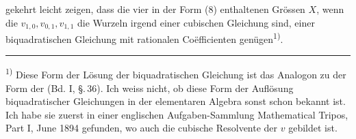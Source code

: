 gekehrt leicht zeigen, dass die vier in der Form (8) enthaltenen
Grössen $X$, wenn die $v_{1,0}, v_{0,1}, v_{1,1}$ die Wurzeln irgend einer
cubischen Gleichung sind, einer biquadratischen Gleichung mit
rationalen Co\"efficienten genügen\textsuperscript{1)}.

\noindent\rule{0.35\linewidth}{0.4pt}

\footnotesize
\noindent\textsuperscript{1)} Diese Form der Lösung der biquadratischen Gleichung ist das
Analogon zu der  Form der  (Bd. I,
\S.\,36). Ich weiss nicht, ob diese Form der Auflösung biquadratischer
Gleichungen in der elementaren Algebra sonst schon bekannt ist. Ich
habe sie zuerst in einer englischen Aufgaben-Sammlung \glqq Mathematical
Tripos, Part I, June 1894\grqq{} gefunden, wo auch die cubische Resolvente
der $v$ gebildet ist.
\normalsize
